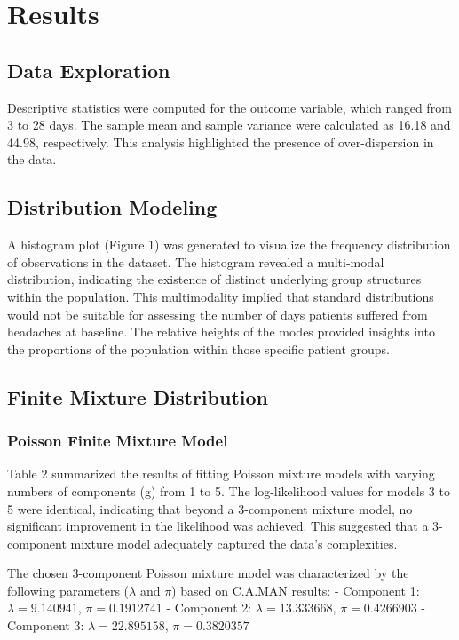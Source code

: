 \documentclass[a4paper, 12pt]{article}
\begin{document}
\section{Results}


\subsection{ Data Exploration}

Descriptive statistics were computed for the outcome variable, which ranged from 3 to 28 days. The sample mean and sample variance were calculated as 16.18 and 44.98, respectively. This analysis highlighted the presence of over-dispersion in the data.

\subsection{Distribution Modeling}

A histogram plot (Figure 1) was generated to visualize the frequency distribution of observations in the dataset. The histogram revealed a multi-modal distribution, indicating the existence of distinct underlying group structures within the population. This multimodality implied that standard distributions would not be suitable for assessing the number of days patients suffered from headaches at baseline. The relative heights of the modes provided insights into the proportions of the population within those specific patient groups.

\subsection{ Finite Mixture Distribution}

\subsubsection{ Poisson Finite Mixture Model}

Table 2 summarized the results of fitting Poisson mixture models with varying numbers of components (g) from 1 to 5. The log-likelihood values for models 3 to 5 were identical, indicating that beyond a 3-component mixture model, no significant improvement in the likelihood was achieved. This suggested that a 3-component mixture model adequately captured the data's complexities.

The chosen 3-component Poisson mixture model was characterized by the following parameters ($\lambda$ and $\pi$) based on C.A.MAN results:
- Component 1: $\lambda = 9.140941$, $\pi = 0.1912741$
- Component 2: $\lambda = 13.333668$, $\pi = 0.4266903$
- Component 3: $\lambda = 22.895158$, $\pi = 0.3820357$
\end{document}

